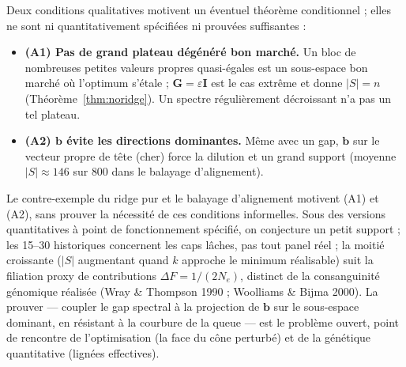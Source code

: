 \documentclass[11pt]{article}
\theoremstyle{plain}
\newcommand{\bb}{\mathbf{b}}
\newcommand{\bG}{\mathbf{G}}
\begin{document}
Deux conditions qualitatives motivent un éventuel théorème conditionnel ; elles ne sont ni quantitativement spécifiées ni prouvées suffisantes :
\begin{itemize}
\item \textbf{(A1) Pas de grand plateau dégénéré bon marché.} Un bloc de nombreuses petites valeurs
  propres quasi-égales est un sous-espace bon marché où l'optimum s'étale ; $\bG = \varepsilon\mathbf{I}$
  est le cas extrême et donne $|S| = n$ (Théorème~\ref{thm:noridge}). Un spectre régulièrement
  décroissant n'a pas un tel plateau.
\item \textbf{(A2) $\bb$ évite les directions dominantes.} Même avec un gap, $\bb$ sur le vecteur
  propre de tête (cher) force la dilution et un grand support (moyenne $|S| \approx 146$ sur $800$ dans
  le balayage d'alignement).
\end{itemize}
Le contre-exemple du ridge pur et le balayage d'alignement motivent (A1) et (A2), sans prouver la nécessité de ces conditions informelles. Sous des versions quantitatives à point de fonctionnement spécifié, on conjecture un petit support ; les 15--30 historiques concernent les caps lâches, pas tout panel réel ; la moitié croissante
($|S|$ augmentant quand $k$ approche le minimum réalisable) suit la filiation
proxy de contributions $\Delta F=1/(2N_e)$, distinct de la consanguinité génomique réalisée (Wray \& Thompson 1990 ;
Woolliams \& Bijma 2000). La prouver --- coupler le gap spectral à la projection de $\bb$ sur le
sous-espace dominant, en résistant à la courbure de la queue --- est le problème ouvert, point de
rencontre de l'optimisation (la face du cône perturbé) et de la génétique quantitative (lignées
effectives).
\end{document}
